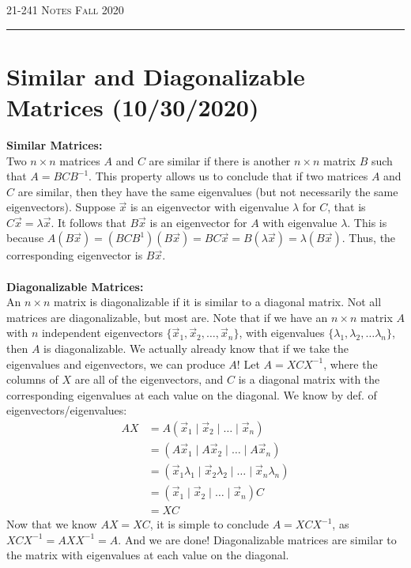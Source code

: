 \documentclass[12pt]{amsart}
\begin{document}
\thispagestyle{empty}

{\scshape 21-241} \hfill {\scshape \Large Notes} \hfill {\scshape Fall 2020}
\medskip
\hrule
\bigskip

\section*{Similar and Diagonalizable Matrices (10/30/2020)}
\textbf{Similar Matrices:}\\
Two $n \times n$ matrices $A$ and $C$ are similar if there is another $n \times n$ matrix $B$ such that $A=BCB^{-1}$. This property allows us to conclude that if two matrices $A$ and $C$ are similar, then they have the same eigenvalues (but not necessarily the same eigenvectors). Suppose $\vec{x}$ is an eigenvector with eigenvalue $\lambda$ for $C$, that is $C \vec{x} = \lambda \vec{x}$. It follows that $B\vec{x}$ is an eigenvector for $A$ with eigenvalue $\lambda$. This is because $A(B\vec{x}) = (BCB^{1})(B\vec{x})=BC\vec{x}=B(\lambda\vec{x})=\lambda(B\vec{x})$. Thus, the corresponding eigenvector is $B\vec{x}$.\\ \\
\textbf{Diagonalizable Matrices:}\\
An $n \times n$ matrix is diagonalizable if it is similar to a diagonal matrix. Not all matrices are diagonalizable, but most are. Note that if we have an $n \times n$ matrix $A$ with $n$ independent eigenvectors $\{\vec{x}_1, \vec{x}_2, \dots , \vec{x}_n\}$, with eigenvalues $\{\lambda_1, \lambda_2, \dots \lambda_n\}$, then $A$ is diagonalizable. We actually already know that if we take the eigenvalues and eigenvectors, we can produce $A$! Let $A = XCX^{-1}$, where the columns of $X$ are all of the eigenvectors, and $C$ is a diagonal matrix with the corresponding eigenvalues at each value on the diagonal. We know by def. of eigenvectors/eigenvalues:
\begin{align*}
	AX &= A (\vec{x}_1 \mid \vec{x}_2 \mid \dots \mid \vec{x}_n)\\
	   &= (A\vec{x}_1 \mid A\vec{x}_2 \mid \dots \mid A\vec{x}_n)\\
	   &= (\vec{x}_1\lambda_1 \mid \vec{x}_2\lambda_2 \mid \dots \mid \vec{x}_n\lambda_n)\\
	   &= (\vec{x}_1 \mid \vec{x}_2 \mid \dots \mid \vec{x}_n)C\\
	   &= XC
\end{align*}
Now that we know $AX = XC$, it is simple to conclude $A = XCX^{-1}$, as $XCX^{-1}=AXX^{-1}=A$. And we are done! Diagonalizable matrices are similar to the matrix with eigenvalues at each value on the diagonal.\\
\end{document}
